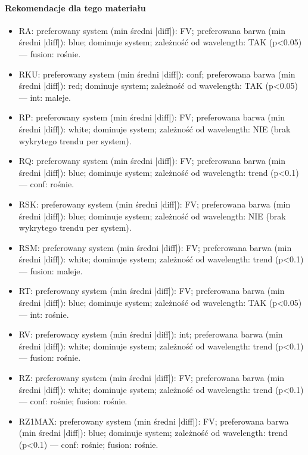 \documentclass[
  10pt,
]{article}
\begin{document}
\paragraph{Rekomendacje dla tego materiału}
\begin{itemize}
\item RA: preferowany system (min średni |diff|): FV; preferowana barwa (min średni |diff|): blue; dominuje system; zależność od wavelength: TAK (p<0.05) — fusion: rośnie.
\item RKU: preferowany system (min średni |diff|): conf; preferowana barwa (min średni |diff|): red; dominuje system; zależność od wavelength: TAK (p<0.05) — int: maleje.
\item RP: preferowany system (min średni |diff|): FV; preferowana barwa (min średni |diff|): white; dominuje system; zależność od wavelength: NIE (brak wykrytego trendu per system).
\item RQ: preferowany system (min średni |diff|): FV; preferowana barwa (min średni |diff|): blue; dominuje system; zależność od wavelength: trend (p<0.1) — conf: rośnie.
\item RSK: preferowany system (min średni |diff|): FV; preferowana barwa (min średni |diff|): blue; dominuje system; zależność od wavelength: NIE (brak wykrytego trendu per system).
\item RSM: preferowany system (min średni |diff|): FV; preferowana barwa (min średni |diff|): white; dominuje system; zależność od wavelength: trend (p<0.1) — fusion: maleje.
\item RT: preferowany system (min średni |diff|): FV; preferowana barwa (min średni |diff|): blue; dominuje system; zależność od wavelength: TAK (p<0.05) — int: rośnie.
\item RV: preferowany system (min średni |diff|): int; preferowana barwa (min średni |diff|): white; dominuje system; zależność od wavelength: trend (p<0.1) — fusion: rośnie.
\item RZ: preferowany system (min średni |diff|): FV; preferowana barwa (min średni |diff|): white; dominuje system; zależność od wavelength: trend (p<0.1) — conf: rośnie; fusion: rośnie.
\item RZ1MAX: preferowany system (min średni |diff|): FV; preferowana barwa (min średni |diff|): blue; dominuje system; zależność od wavelength: trend (p<0.1) — conf: rośnie; fusion: rośnie.
\end{itemize}
\end{document}
